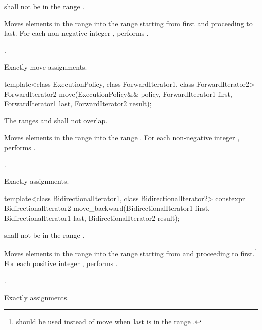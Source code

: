 \begin{itemdescr}
\pnum
\requires
{}
shall not be in the range
.

\pnum
\effects
Moves elements in the range 
into the range 
starting from first and proceeding to last.
For each non-negative integer
,
performs
 .

\pnum
\returns
{}.

\pnum
\complexity
Exactly
move assignments.
\end{itemdescr}

%
\begin{itemdecl}
template<class ExecutionPolicy, class ForwardIterator1, class ForwardIterator2>
  ForwardIterator2 move(ExecutionPolicy&& policy,
                        ForwardIterator1 first, ForwardIterator1 last,
                        ForwardIterator2 result);
\end{itemdecl}

\begin{itemdescr}
\pnum
\requires The ranges  and
 shall not overlap.

\pnum
\effects Moves elements in the range  into
the range .
For each non-negative integer ,
performs .

\pnum
\returns {}.

\pnum
\complexity Exactly  assignments.
\end{itemdescr}

%
\begin{itemdecl}
template<class BidirectionalIterator1, class BidirectionalIterator2>
  constexpr BidirectionalIterator2
    move_backward(BidirectionalIterator1 first, BidirectionalIterator1 last,
                  BidirectionalIterator2 result);
\end{itemdecl}

\begin{itemdescr}
\pnum
\requires
{}
shall not be in the range
.

\pnum
\effects
Moves elements in the range 
into the
range 
starting from
and proceeding to first.\footnote{
should be used instead of move when last
is in
the range
.}
For each positive integer
,
performs
.

\pnum
\returns
{}.

\pnum
\complexity
Exactly
assignments.
\end{itemdescr}

